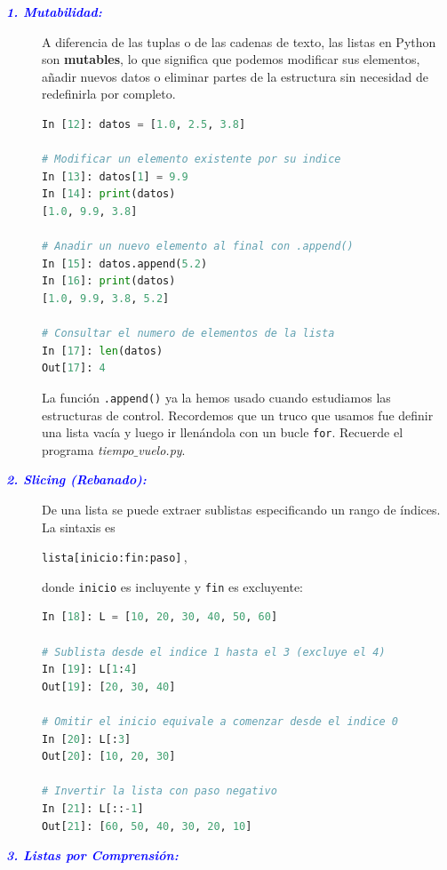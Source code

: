 \documentclass[12pt]{article}
\begin{document}
\begin{description}
 \item[\textbf{\textcolor{blue}{\textit{1. Mutabilidad:}}}] 
A diferencia de las tuplas o de las cadenas de texto, las listas en Python son 
\textbf{mutables}, lo que significa que podemos modificar sus elementos, 
añadir nuevos datos o eliminar partes de la estructura sin necesidad de redefinirla por completo.

\begin{lstlisting}[language=Python]
In [12]: datos = [1.0, 2.5, 3.8]

# Modificar un elemento existente por su indice
In [13]: datos[1] = 9.9
In [14]: print(datos)
[1.0, 9.9, 3.8]

# Anadir un nuevo elemento al final con .append()
In [15]: datos.append(5.2)
In [16]: print(datos)
[1.0, 9.9, 3.8, 5.2]

# Consultar el numero de elementos de la lista
In [17]: len(datos)
Out[17]: 4
\end{lstlisting}
%
La función \lstinline|.append()| ya la hemos usado cuando estudiamos las estructuras de 
control. Recordemos que un truco que usamos fue definir una lista vacía y luego ir llenándola 
con un bucle \lstinline|for|. Recuerde el programa \textit{tiempo$\_$vuelo.py}.

\item[\textbf{\textcolor{blue}{\textit{2. Slicing (Rebanado):}}}] 

De una lista se puede extraer sublistas especificando un rango de índices. La sintaxis es 
\begin{center}
\lstinline|lista[inicio:fin:paso]|\,,    
\end{center}
 donde \texttt{inicio} es incluyente y \texttt{fin} es excluyente:

\begin{lstlisting}[language=Python]
In [18]: L = [10, 20, 30, 40, 50, 60]

# Sublista desde el indice 1 hasta el 3 (excluye el 4)
In [19]: L[1:4]
Out[19]: [20, 30, 40]

# Omitir el inicio equivale a comenzar desde el indice 0
In [20]: L[:3]
Out[20]: [10, 20, 30]

# Invertir la lista con paso negativo
In [21]: L[::-1]
Out[21]: [60, 50, 40, 30, 20, 10]
\end{lstlisting}

\item[\textbf{\textcolor{blue}{\textit{3. Listas por Comprensión:}}}] 


\end{description}
\end{document}
